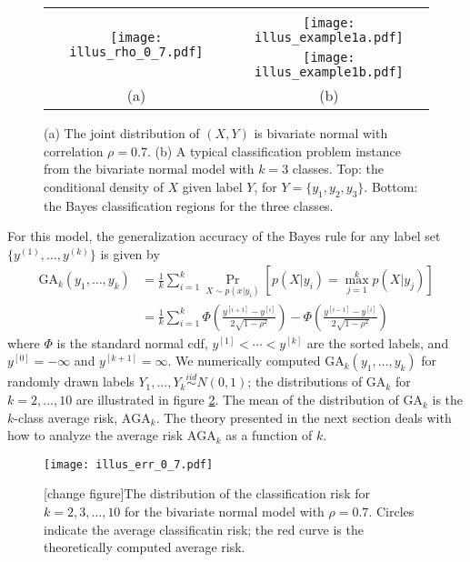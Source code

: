 \documentclass[12pt]{article}
\begin{document}
\begin{figure}[h]
\centering
\begin{tabular}{cc}
\multirow{3}{*}{\texttt{[image: illus\_rho\_0\_7.pdf]}} & \\
& \texttt{[image: illus\_example1a.pdf]}\\
 &  \texttt{[image: illus\_example1b.pdf]}\\
(a) & (b)
\end{tabular}

\caption{
(a) The joint distribution of $(X, Y)$ is bivariate normal with correlation $\rho = 0.7$.
(b) A typical classification problem instance from the bivariate normal model with $k = 3$ classes.
Top: the conditional density of $X$ given label $Y$, for $Y = \{y_1, y_2, y_3\}$.
Bottom: the Bayes classification regions for the three classes.}\label{fig:toy1}
\end{figure}

For this model, the generalization accuracy of the Bayes rule for any label set $\{y^{(1)},\hdots, y^{(k)}\}$ is given by
\begin{align*}
\text{GA}_k(y_1,\hdots, y_k) &= \frac{1}{k}\sum_{i=1}^k \Pr_{X \sim p(x|y_i)}[p(X|y_i) = \max_{j=1}^k p(X|y_j)]
\\&= \frac{1}{k}\sum_{i=1}^k \Phi\left(\frac{y^{[i+1]} - y^{[i]}}{2\sqrt{1-\rho^2}}\right) - \Phi\left(\frac{y^{[i-1]} - y^{[i]}}{2\sqrt{1-\rho^2}}\right)
\end{align*}
where $\Phi$ is the standard normal cdf, $y^{[1]} < \cdots < y^{[k]}$ are the sorted labels, and $y^{[0]} = -\infty$ and $y^{[k+1]} = \infty$.
We numerically computed $\text{GA}_k(y_1,\hdots, y_k)$ for randomly
drawn labels $Y_1,\hdots, Y_k \stackrel{iid}{\sim} N(0, 1)$; the
distributions of $\text{GA}_k$ for $k = 2,\hdots, 10$
are illustrated in figure \ref{fig:toy2}.  The mean of the distribution of $\text{GA}_k$ is the $k$-class average risk,
$\text{AGA}_k$. The theory
presented in the next section deals with how to analyze the
average risk $\text{AGA}_k$ as a function of $k$. 


\begin{figure}[h]
\centering
\texttt{[image: illus\_err\_0\_7.pdf]}

\caption{[change figure]The distribution of the classification risk for $k = 2,3,\hdots, 10$ for the bivariate normal model with $\rho = 0.7$.
Circles indicate the average classificatin risk; the red curve is the theoretically computed average risk.}\label{fig:toy2}
\end{figure}
\end{document}
